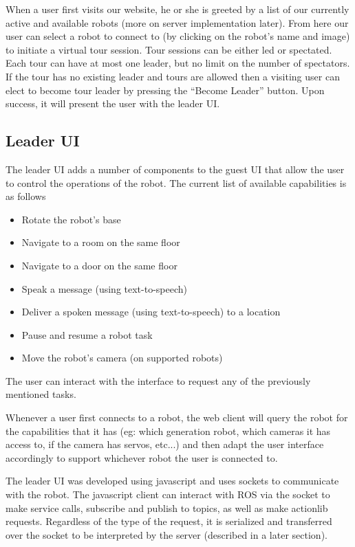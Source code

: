 \documentclass{sig-alternate-05-2015}
\begin{document}
When a user first visits our website, he or she is greeted by a list of our
currently active and available robots (more on server implementation later).
From here our user can select a robot to connect to (by clicking on the robot's
name and image) to initiate a virtual tour session. Tour sessions can be either
led or spectated. Each tour can have at most one leader, but no limit on the
number of spectators. If the tour has no existing leader and tours are allowed
then a visiting user can elect to become tour leader by pressing the ``Become
Leader'' button. Upon success, it will present the user with the leader UI.

\subsection{Leader UI}

The leader UI adds a number of components to the guest UI that allow the user to
control the operations of the robot. The current list of available capabilities
is as follows

\begin{itemize}
  \item Rotate the robot's base
  \item Navigate to a room on the same floor
  \item Navigate to a door on the same floor
  \item Speak a message (using text-to-speech)
  \item Deliver a spoken message (using text-to-speech) to a location
  \item Pause and resume a robot task
  \item Move the robot's camera (on supported robots)
\end{itemize}

The user can interact with the interface to request any of the previously
mentioned tasks.

Whenever a user first connects to a robot, the web client will query the robot
for the capabilities that it has (eg: which generation robot, which cameras it
has access to, if the camera has servos, etc...) and then adapt the user
interface accordingly to support whichever robot the user is connected to.

The leader UI was developed using javascript and uses sockets to
communicate with the robot. The javascript client can interact with ROS via the
socket to make service calls, subscribe and publish to topics, as well as make
actionlib requests. Regardless of the type of the request, it is serialized and
transferred over the socket to be interpreted by the server (described in a
later section).
\end{document}
